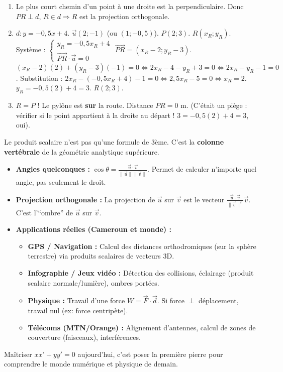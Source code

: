 \documentclass[11pt]{article}
\begin{document}
\begin{corrige}[Exercice 3]
\begin{enumerate}
    \item Le plus court chemin d'un point à une droite est la perpendiculaire. Donc $PR \perp d$, $R \in d \Rightarrow R$ est la projection orthogonale.
    \item $d : y = -0,5x + 4$. $\vec{u}(2; -1)$ (ou $(1; -0,5)$). $P(2;3)$. $R(x_R; y_R)$.
    Système : $\begin{cases} y_R = -0,5 x_R + 4 \\ \overrightarrow{PR} \cdot \vec{u} = 0 \end{cases}$
    $\overrightarrow{PR} = (x_R-2; y_R-3)$.
    $(x_R-2)(2) + (y_R-3)(-1) = 0 \iff 2x_R - 4 - y_R + 3 = 0 \iff 2x_R - y_R - 1 = 0$.
    Substitution : $2x_R - (-0,5x_R + 4) - 1 = 0 \iff 2,5x_R - 5 = 0 \iff x_R = 2$.
    $y_R = -0,5(2) + 4 = 3$.
    $R(2; 3)$.
    \item $R = P$ ! Le pylône est \textbf{sur} la route. Distance $PR = 0$ m. (C'était un piège : vérifier si le point appartient à la droite au départ ! $3 = -0,5(2)+4 = 3$, oui).
\end{enumerate}
\end{corrige}

\begin{savaistu}
Le produit scalaire n'est pas qu'une formule de 3ème. C'est la \textbf{colonne vertébrale} de la géométrie analytique supérieure.
\begin{itemize}
    \item \textbf{Angles quelconques :} $\cos \theta = \frac{\vec{u}\cdot\vec{v}}{\|\vec{u}\|\|\vec{v}\|}$. Permet de calculer n'importe quel angle, pas seulement le droit.
    \item \textbf{Projection orthogonale :} La projection de $\vec{u}$ sur $\vec{v}$ est le vecteur $\frac{\vec{u}\cdot\vec{v}}{\|\vec{v}\|^2}\vec{v}$. C'est l'``ombre'' de $\vec{u}$ sur $\vec{v}$.
    \item \textbf{Applications réelles (Cameroun et monde) :}
    \begin{itemize}
        \item \textbf{GPS / Navigation :} Calcul des distances orthodromiques (sur la sphère terrestre) via produits scalaires de vecteurs 3D.
        \item \textbf{Infographie / Jeux vidéo :} Détection des collisions, éclairage (produit scalaire normale/lumière), ombres portées.
        \item \textbf{Physique :} Travail d'une force $W = \vec{F} \cdot \vec{d}$. Si force $\perp$ déplacement, travail nul (ex: force centripète).
        \item \textbf{Télécoms (MTN/Orange) :} Alignement d'antennes, calcul de zones de couverture (faisceaux), interférences.
    \end{itemize}
\end{itemize}
Maîtriser $xx' + yy' = 0$ aujourd'hui, c'est poser la première pierre pour comprendre le monde numérique et physique de demain.
\end{savaistu}
\end{document}

